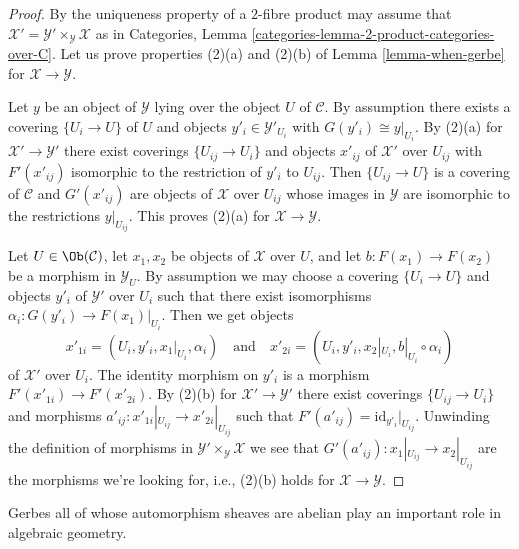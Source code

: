 \begin{proof}
By the uniqueness property of a $2$-fibre product may assume that
$\mathcal{X}' = \mathcal{Y}' \times_\mathcal{Y} \mathcal{X}$
as in
Categories, Lemma \ref{categories-lemma-2-product-categories-over-C}.
Let us prove properties (2)(a) and (2)(b) of
Lemma \ref{lemma-when-gerbe}
for $\mathcal{X} \to \mathcal{Y}$.

\medskip\noindent
Let $y$ be an object of $\mathcal{Y}$ lying over the object $U$
of $\mathcal{C}$. By assumption there exists
a covering $\{U_i \to U\}$ of $U$ and objects
$y'_i \in \mathcal{Y}'_{U_i}$ with $G(y'_i) \cong y|_{U_i}$.
By (2)(a) for $\mathcal{X}' \to \mathcal{Y}'$ there exist
coverings $\{U_{ij} \to U_i\}$ and objects $x'_{ij}$ of
$\mathcal{X}'$ over $U_{ij}$ with $F'(x'_{ij})$ isomorphic
to the restriction of $y'_i$ to $U_{ij}$. Then
$\{U_{ij} \to U\}$ is a covering of $\mathcal{C}$ and
$G'(x'_{ij})$ are objects of $\mathcal{X}$ over $U_{ij}$
whose images in $\mathcal{Y}$ are isomorphic to the restrictions
$y|_{U_{ij}}$. This proves (2)(a) for $\mathcal{X} \to \mathcal{Y}$.

\medskip\noindent
Let $U \in \Ob(\mathcal{C})$, let $x_1, x_2$ be objects of
$\mathcal{X}$ over $U$, and let $b : F(x_1) \to F(x_2)$ be a morphism
in $\mathcal{Y}_U$. By assumption we may choose a covering
$\{U_i \to U\}$ and objects $y'_i$ of $\mathcal{Y}'$
over $U_i$ such that there exist isomorphisms
$\alpha_i : G(y'_i) \to F(x_1)|_{U_i}$.
Then we get objects
$$
x'_{1i} = (U_i, y'_i, x_1|_{U_i}, \alpha_i)
\quad\text{and}\quad
x'_{2i} = (U_i, y'_i, x_2|_{U_i}, b|_{U_i} \circ \alpha_i)
$$
of $\mathcal{X}'$ over $U_i$. The identity morphism on $y'_i$ is a
morphism $F'(x'_{1i}) \to F'(x'_{2i})$. By (2)(b) for
$\mathcal{X}' \to \mathcal{Y}'$ there exist coverings
$\{U_{ij} \to U_i\}$ and morphisms
$a'_{ij} : x'_{1i}|_{U_{ij}} \to x'_{2i}|_{U_{ij}}$
such that $F'(a'_{ij}) = \text{id}_{y'_i}|_{U_{ij}}$. Unwinding the definition
of morphisms in $\mathcal{Y}' \times_\mathcal{Y} \mathcal{X}$
we see that $G'(a'_{ij}) : x_1|_{U_{ij}} \to x_2|_{U_{ij}}$ are
the morphisms we're looking for, i.e., (2)(b) holds for
$\mathcal{X} \to \mathcal{Y}$.
\end{proof}

\noindent
Gerbes all of whose automorphism sheaves are abelian play an important
role in algebraic geometry.

